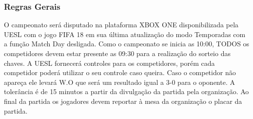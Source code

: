 \subsubsection{Regras Gerais}

O campeonato será disputado na plataforma XBOX ONE disponibilizada pela UESL com o jogo FIFA 18 em sua última atualização do modo Temporadas com a função Match Day desligada.
Como o campeonato se inicia as 10:00, TODOS os competidores devem estar presente as 09:30 para a realização do sorteio das chaves.
A UESL fornecerá controles para os competidores, porém cada competidor poderá utilizar o seu controle caso queira.
Caso o competidor não apareça ele levará W.O que será um resultado igual a 3-0 para o oponente. A tolerância é de 15 minutos a partir da divulgação da partida pela organização.
Ao final da partida os jogadores devem reportar à mesa da organização o placar da partida.